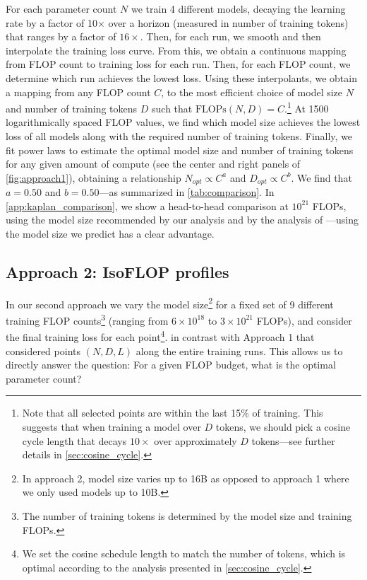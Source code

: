 \documentclass[11pt, a4paper, logo, copyright, nonumbering]{deepmind}
\begin{document}
For each parameter count $N$ we train 4 different models, decaying the learning rate by a factor of 10$\times$ over a horizon (measured in number of training tokens) that ranges by a factor of $16 \times$.
Then, for each run, we smooth and then interpolate the training loss curve.
From this, we obtain a continuous mapping from FLOP count to training loss for each run.
Then, for each FLOP count, we determine which run achieves the lowest loss.
Using these interpolants, we obtain a mapping from any FLOP count $C$, to the most efficient choice of model size $N$ and number of training tokens $D$ such that $\text{FLOPs}(N,D) = C$.\footnote{Note that all selected points are within the last 15\% of training. This suggests that when training a model over $D$ tokens, we should pick a cosine cycle length that decays $10 \times$ over approximately $D$ tokens---see further details in \autoref{sec:cosine_cycle}.}
At 1500 logarithmically spaced FLOP values, we find which model size achieves the lowest loss of all models along with the required number of training tokens.
Finally, we fit power laws to estimate the optimal model size and number of training tokens for any given amount of compute (see the center and right panels of \autoref{fig:approach1}), obtaining a relationship $N_{opt} \propto C^a$ and $D_{opt} \propto C^b$.
We find that $a=0.50$ and $b=0.50$---as summarized in \autoref{tab:comparison}.
In \autoref{app:kaplan_comparison}, we show a head-to-head comparison at $10^{21}$ FLOPs, using the model size recommended by our analysis and by the analysis of \citet{kaplan2020scaling}---using the model size we predict has a clear advantage.

\subsection{Approach 2: IsoFLOP profiles}
In our second approach we vary the model size\footnote{In approach 2, model size varies up to 16B as opposed to approach 1 where we only used models up to 10B.} for a fixed set of 9 different training FLOP counts\footnote{The number of training tokens is determined by the model size and training FLOPs.} (ranging from $6 \times10^{18}$ to  $3 \times 10^{21}$ FLOPs), and consider the final training loss for each point\footnote{We set the cosine schedule length to match the number of tokens, which is optimal according to the analysis presented in \autoref{sec:cosine_cycle}.}. in contrast with Approach 1 that considered points $(N, D, L)$ along the entire training runs.
This allows us to directly answer the question: For a given FLOP budget, what is the optimal parameter count?
\end{document}
